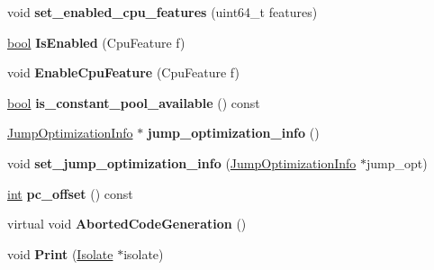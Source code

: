 \begin{DoxyCompactItemize}
void {\bfseries set\+\_\+enabled\+\_\+cpu\+\_\+features} (uint64\+\_\+t features)
\item 
\mbox{\label{classv8_1_1internal_1_1AssemblerBase_a1eaf5b9a9d0998b6bc3104cf32c08d7c}} 
\mbox{\hyperlink{classbool}{bool}} {\bfseries Is\+Enabled} (Cpu\+Feature f)
\item 
\mbox{\label{classv8_1_1internal_1_1AssemblerBase_a39a7d774cb3ddac24d06a7ddb57aedcb}} 
void {\bfseries Enable\+Cpu\+Feature} (Cpu\+Feature f)
\item 
\mbox{\label{classv8_1_1internal_1_1AssemblerBase_a4af0da6410c4578326b5e59e8b6a05b7}} 
\mbox{\hyperlink{classbool}{bool}} {\bfseries is\+\_\+constant\+\_\+pool\+\_\+available} () const
\item 
\mbox{\label{classv8_1_1internal_1_1AssemblerBase_a4c177906403b8df7667189c4faf11c0a}} 
\mbox{\hyperlink{classv8_1_1internal_1_1JumpOptimizationInfo}{Jump\+Optimization\+Info}} $\ast$ {\bfseries jump\+\_\+optimization\+\_\+info} ()
\item 
\mbox{\label{classv8_1_1internal_1_1AssemblerBase_a420b793343fe992e7e657fdc2a43cd67}} 
void {\bfseries set\+\_\+jump\+\_\+optimization\+\_\+info} (\mbox{\hyperlink{classv8_1_1internal_1_1JumpOptimizationInfo}{Jump\+Optimization\+Info}} $\ast$jump\+\_\+opt)
\item 
\mbox{\label{classv8_1_1internal_1_1AssemblerBase_aba9d70b93c0a4747c3c0c5ef494ac23f}} 
\mbox{\hyperlink{classint}{int}} {\bfseries pc\+\_\+offset} () const
\item 
\mbox{\label{classv8_1_1internal_1_1AssemblerBase_aa5bf23c158a9df7762e8529aeda8e25e}} 
virtual void {\bfseries Aborted\+Code\+Generation} ()
\item 
\mbox{\label{classv8_1_1internal_1_1AssemblerBase_a78aa6aa9bce96e406c1e00c366499d95}} 
void {\bfseries Print} (\mbox{\hyperlink{classv8_1_1internal_1_1Isolate}{Isolate}} $\ast$isolate)
\end{DoxyCompactItemize}
